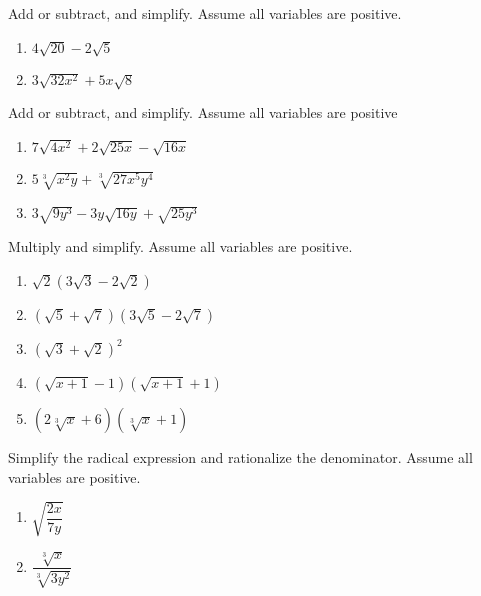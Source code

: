 \begin{exercise}
  Add or subtract, and simplify. Assume all variables are positive.
  
  \begin{enumerate}
  \item
    \(4\sqrt{20}-2\sqrt5\)
  \item
    \(3\sqrt{32x^2}+5x\sqrt{8}\)
  \end{enumerate}
\end{exercise}

\begin{exercise}
  Add or subtract, and simplify. Assume all variables are positive
  
  \begin{enumerate}
  \item
    \(7\sqrt{4x^2}+2\sqrt{25x}-\sqrt{16x}\)
  \item
    \(5\sqrt[3]{x^2y}+\sqrt[3]{27x^5y^4}\)
  \item
    \(3\sqrt{9y^3}-3y\sqrt{16y}+\sqrt{25y^3}\)
  \end{enumerate}
\end{exercise}

\begin{exercise}
  Multiply and simplify. Assume all variables are positive.
  
  \begin{enumerate}
  \item
    \(\sqrt2(3\sqrt3-2\sqrt2)\)
  \item
    \((\sqrt5+\sqrt7)(3\sqrt5-2\sqrt7)\)
  \item
    \((\sqrt3+\sqrt2)^2\)
  \item
    \((\sqrt{x+1}-1)(\sqrt{x+1}+1)\)
  \item
    \((2\sqrt[3]x+6)(\sqrt[3]x+1)\)
  \end{enumerate}
\end{exercise}

\begin{exercise}
  Simplify the radical expression and rationalize the denominator. Assume
  all variables are positive.
  
  \begin{enumerate}
  \item
    \(\sqrt{\dfrac{2x}{7y}}\)
  \item
    \(\dfrac{\sqrt[3]{x}}{\sqrt[3]{3y^2}}\)
  \end{enumerate}
\end{exercise}

